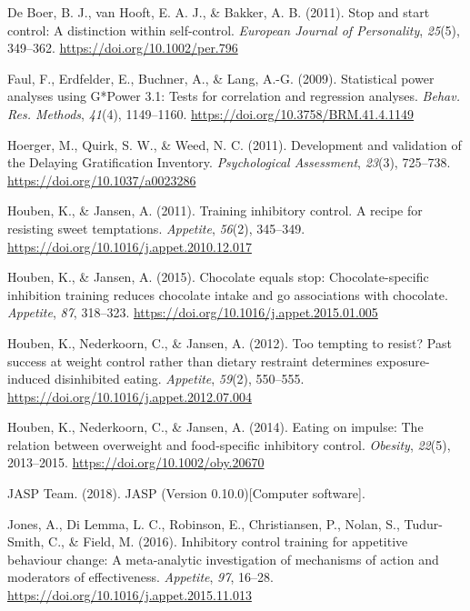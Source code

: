 \documentclass[man,floatsintext]{apa6}
\begin{document}
\hypertarget{ref-deboerStopStartControl2011}{}
De Boer, B. J., van Hooft, E. A. J., \& Bakker, A. B. (2011). Stop and
start control: A distinction within self-control. \emph{European Journal
of Personality}, \emph{25}(5), 349--362.
\url{https://doi.org/10.1002/per.796}

\hypertarget{ref-faul_statistical_2009}{}
Faul, F., Erdfelder, E., Buchner, A., \& Lang, A.-G. (2009). Statistical
power analyses using G*Power 3.1: Tests for correlation and regression
analyses. \emph{Behav. Res. Methods}, \emph{41}(4), 1149--1160.
\url{https://doi.org/10.3758/BRM.41.4.1149}

\hypertarget{ref-hoergerDevelopmentValidationDelaying2011}{}
Hoerger, M., Quirk, S. W., \& Weed, N. C. (2011). Development and
validation of the Delaying Gratification Inventory. \emph{Psychological
Assessment}, \emph{23}(3), 725--738.
\url{https://doi.org/10.1037/a0023286}

\hypertarget{ref-houben_training_2011}{}
Houben, K., \& Jansen, A. (2011). Training inhibitory control. A recipe
for resisting sweet temptations. \emph{Appetite}, \emph{56}(2),
345--349. \url{https://doi.org/10.1016/j.appet.2010.12.017}

\hypertarget{ref-houben_chocolate_2015}{}
Houben, K., \& Jansen, A. (2015). Chocolate equals stop:
Chocolate-specific inhibition training reduces chocolate intake and go
associations with chocolate. \emph{Appetite}, \emph{87}, 318--323.
\url{https://doi.org/10.1016/j.appet.2015.01.005}

\hypertarget{ref-houben_too_2012}{}
Houben, K., Nederkoorn, C., \& Jansen, A. (2012). Too tempting to
resist? Past success at weight control rather than dietary restraint
determines exposure-induced disinhibited eating. \emph{Appetite},
\emph{59}(2), 550--555.
\url{https://doi.org/10.1016/j.appet.2012.07.004}

\hypertarget{ref-houben_eating_2014}{}
Houben, K., Nederkoorn, C., \& Jansen, A. (2014). Eating on impulse: The
relation between overweight and food-specific inhibitory control.
\emph{Obesity}, \emph{22}(5), 2013--2015.
\url{https://doi.org/10.1002/oby.20670}

\hypertarget{ref-JASP2018:1}{}
JASP Team. (2018). JASP (Version 0.10.0){[}Computer software{]}.

\hypertarget{ref-jones_inhibitory_2016}{}
Jones, A., Di Lemma, L. C., Robinson, E., Christiansen, P., Nolan, S.,
Tudur-Smith, C., \& Field, M. (2016). Inhibitory control training for
appetitive behaviour change: A meta-analytic investigation of mechanisms
of action and moderators of effectiveness. \emph{Appetite}, \emph{97},
16--28. \url{https://doi.org/10.1016/j.appet.2015.11.013}
\end{document}
